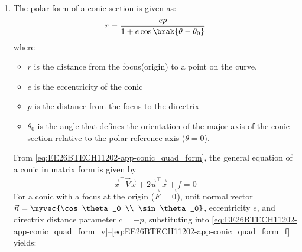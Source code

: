 \begin{enumerate}[label=\thesubsection.\arabic*, ref=\thesubsection.\theenumi]
\begin{align}
  \label{eq:EE26BTECH11202-app-conic_quad_form_v}
\vec{V} &=\norm{\vec{n}}^2\vec{I}-e^2\vec{n}\vec{n}^{\top}, 
\\
\label{eq:EE26BTECH11202-app-conic_quad_form_u}
\vec{u} &= ce^2\vec{n}-\norm{\vec{n}}^2\vec{F}, 
\\
\label{eq:EE26BTECH11202-app-conic_quad_form_f}
f &= \norm{\vec{n}}^2\norm{\vec{F}}^2-c^2e^2
    \end{align}
\solution
\begin{align}
\|\vec{x} - \vec{F}\|^2 &= e^2 \frac{(\vec{n}^\top \vec{x} - c)^2}{\|\vec{n}\|^2} 
\\
\implies \|\vec{n}\|^2 (\vec{x} - \vec{F})^\top (\vec{x} - \vec{F}) &= e^2 \left(\vec{n}^\top \vec{x} - c\right)^2 
\\
\implies \|\vec{n}\|^2 \left(\vec{x}^\top \vec{x} - 2\vec{F}^\top \vec{x} + \|\vec{F}\|^2\right) &= e^2 \left(c^2 + \left(\vec{n}^\top \vec{x}\right)^2 - 2c\vec{n}^\top \vec{x}\right) 
\\
= e^2 \left(c^2 + \left(\vec{x}^\top \vec{n}\vec{n}^\top \vec{x}\right) - 2c\vec{n}^\top \vec{x}\right)
\end{align}
which can be expressed as \eqref{eq:EE26BTECH11202-app-conic_quad_form} after simplification.
\item The polar form of a conic section is given as: 
\begin{align}
	r = \frac{ep}{1 + e\cos\brak{\theta - \theta_0}} \label{eq:EE26BTECH11202-polar_conic}
\end{align}
where
\begin{itemize}
	\item $r$ is the distance from the focus(origin) to a point on the curve.
	\item $e$ is the eccentricity of the conic
	\item $p$ is the distance from the focus to the directrix
	\item $\theta _{0}$ is the angle that defines the orientation of the major axis of the conic section relative to the polar reference axis ($\theta = 0$).
\end{itemize}
\solution
From \eqref{eq:EE26BTECH11202-app-conic_quad_form}, the general equation of a conic in matrix form is given by
\begin{align}
    \vec{x}^{\top}\vec{V}\vec{x} + 2\vec{u}^{\top}\vec{x} + f = 0
    \label{eq:EE26BTECH11202-conic_matrix}
\end{align}
For a conic with a focus at the origin ($\vec{F} = \vec{0}$), unit normal vector $\vec{n} = \myvec{\cos\theta_0 \\ \sin\theta_0}$, eccentricity $e$, and directrix distance parameter $c = -p$, substituting into \eqref{eq:EE26BTECH11202-app-conic_quad_form_v}--\eqref{eq:EE26BTECH11202-app-conic_quad_form_f} yields:

\end{enumerate}
